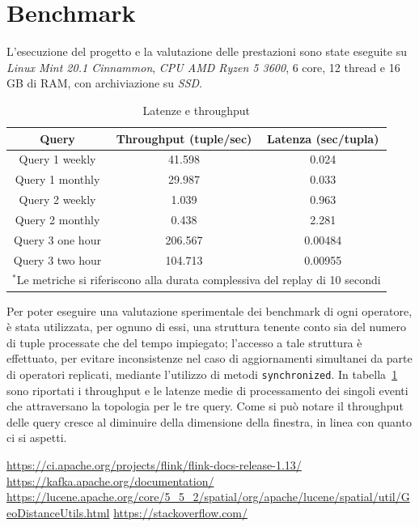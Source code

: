 \documentclass[conference]{IEEEtran}
\begin{document}
\section{\textbf{Benchmark}}
L'esecuzione del progetto e la valutazione delle prestazioni sono state eseguite su \emph{Linux Mint 20.1 Cinnammon}, \emph{CPU AMD Ryzen 5 3600}, 6 core, 12 thread e 16 GB di RAM, con archiviazione su \emph{SSD}. \\
\begin{table}[htbp]
\caption{Latenze e throughput}
\begin{center}
    \begin{tabular}{|c|c|c|}
    \hline
    \textbf{Query} & \textbf{Throughput (tuple/sec)} & \textbf{Latenza (sec/tupla)}  \\ \hline
    Query 1 weekly & 41.598 & 0.024  \\ \hline
    Query 1 monthly & 29.987 & 0.033  \\ \hline
    Query 2 weekly & 1.039 & 0.963  \\ \hline
    Query 2 monthly & 0.438 & 2.281 \\ \hline
    Query 3 one hour & 206.567 & 0.00484  \\ \hline
    Query 3 two hour & 104.713 & 0.00955  \\ \hline
    \multicolumn{3}{l}{$^{\mathrm{*}}$Le metriche si riferiscono alla durata complessiva del replay di 10 secondi}
    \end{tabular}
\label{tab1}
\end{center}
\end{table}
\par Per poter eseguire una valutazione sperimentale dei
benchmark di ogni operatore, \`{e} stata utilizzata, per ognuno
di essi, una struttura tenente conto sia del numero di tuple
processate che del tempo impiegato; l'accesso a tale
struttura \`{e} effettuato, per evitare inconsistenze nel caso di
aggiornamenti simultanei da parte di operatori replicati,
mediante l’utilizzo di metodi \texttt{​synchronized​}.
In tabella~\ref{tab1} sono riportati i throughput e le latenze medie di processamento dei singoli eventi che attraversano la topologia per le tre query. Come si pu\`{o} notare il throughput delle query cresce al diminuire della dimensione della finestra, in linea con quanto ci si aspetti. 

\begin{thebibliography}{00}
 \url{https://ci.apache.org/projects/flink/flink-docs-release-1.13/}
 \url{https://kafka.apache.org/documentation/}
 \url{https://lucene.apache.org/core/5_5_2/spatial/org/apache/lucene/spatial/util/GeoDistanceUtils.html}
 \url{https://stackoverflow.com/}

\end{thebibliography}
\end{document}
